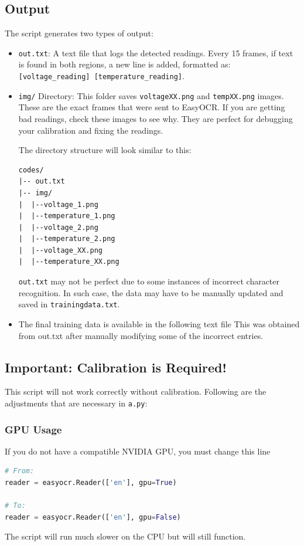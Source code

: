 \subsection{Output}\label{output}
The script generates two types of output:
\begin{itemize}
    \item \texttt{out.txt}: A text file that logs the detected readings. Every 15 frames, if text is found in both regions, a new line is added, formatted as: \texttt{[voltage\_reading] [temperature\_reading]}.
    \item \texttt{img/} Directory: This folder saves \texttt{voltageXX.png} and \texttt{tempXX.png} images. These are the exact frames that were sent to EasyOCR. If you are getting bad readings, check these images to see why. They are perfect for debugging your calibration and fixing the readings.

The directory structure will look similar to this:
\begin{lstlisting}
codes/
|-- out.txt
|-- img/
|  |--voltage_1.png
|  |--temperature_1.png
|  |--voltage_2.png
|  |--temperature_2.png
|  |--voltage_XX.png
|  |--temperature_XX.png
\end{lstlisting}

\texttt{out.txt} may not be perfect due to some instances of incorrect character recognition. In such case, the data may have to be manually updated and saved in \texttt{trainingdata.txt}.

\item The final training data is available in the following text file
This was obtained from out.txt after manually modifying some of the incorrect entries.
\end{itemize}

\subsection{Important: Calibration is Required!}\label{important-calibration-is-required}
This script {will not work correctly} without calibration.   Following are the adjustments that are necessary in \texttt{a.py}:

\subsubsection{GPU Usage}\label{gpu-usage}
If you {do not} have a compatible NVIDIA GPU, you must change this line
\begin{lstlisting}[language=python]
# From:
reader = easyocr.Reader(['en'], gpu=True)

# To:
reader = easyocr.Reader(['en'], gpu=False)
\end{lstlisting}
The script will run much slower on the CPU but will still function.

